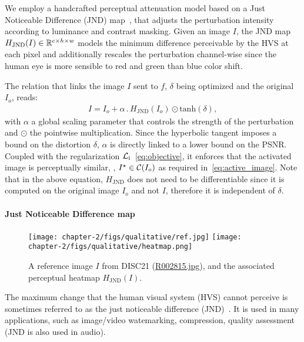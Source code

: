 We employ a handcrafted perceptual attenuation model
based on a Just Noticeable Difference (JND) map~\citep{wu2017enhanced}, that adjusts the perturbation intensity according to luminance and contrast masking.
Given an image $I$, the JND map $H_{\mathrm{JND}}(I)\in \mathbb{R}^{c\times h \times w}$ models the minimum difference perceivable by the HVS at each pixel and additionally rescales the perturbation channel-wise since the human eye is more sensible to red and green than blue color shift.

The relation that links the image $I$ sent to $f$, $\delta$ being optimized and the original $I_o$, reads:
\vspace*{-1em}
\begin{align}
    I = I_o + \alpha \,.\, H_{\mathrm{JND}}(I_o) \odot \mathrm{tanh}(\delta),
    \label{eq:scaling}
\end{align}
with $\alpha$ a global scaling parameter that controls the strength of the perturbation and $\odot$ the pointwise multiplication. 
Since the hyperbolic tangent imposes a bound on the distortion $\delta$, $\alpha$ is directly linked to a lower bound on the PSNR.
Coupled with the regularization $\mathcal{L}_{\mathrm{i}}$~\eqref{eq:objective}, it enforces that the activated image is perceptually similar, \ie, $I^\star\in \mathcal{C}(I_o)$ as required in~\eqref{eq:active_image}.
Note that in the above equation, $H_{\mathrm{JND}}$ does not need to be differentiable since it is computed on the original image $I_o$ and not $I$, therefore it is independent of $\delta$.

\paragraph*{Just Noticeable Difference map}

\begin{figure}[b!]
    \centering
    \hspace{1em}
    \texttt{[image: chapter-2/figs/qualitative/ref.jpg]}
    \hspace{0.1\textwidth}
    \captionsetup{font=small}
    \texttt{[image: chapter-2/figs/qualitative/heatmap.png]}
    \caption[Caption]{A reference image $I$ from DISC21 (\href{http://www.flickr.com/photos/61368956@N00/5060849004/}{R002815.jpg}), and the associated perceptual heatmap $H_{\mathrm{JND}}(I)$.}
    \label{chap2/fig:heatmap}
\end{figure}

The maximum change that the human visual system (HVS) cannot perceive is sometimes referred to as the just noticeable difference (JND)~\citep{krueger1989reconciling}. 
It is used in many applications, such as image/video watemarking, compression, quality assessment (JND is also used in audio). 

